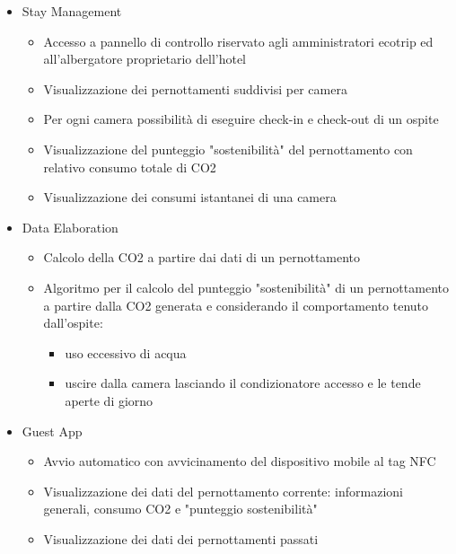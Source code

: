 \begin{itemize}
    \begin{itemize}
        \item Stay Management
        \begin{itemize}
            \item Accesso a pannello di controllo riservato agli amministratori ecotrip ed all'albergatore proprietario dell'hotel
            \item Visualizzazione dei pernottamenti suddivisi per camera
            \item Per ogni camera possibilità di eseguire check-in e check-out di un ospite
            \item Visualizzazione del punteggio "sostenibilità" del pernottamento con relativo consumo totale di CO2
            \item Visualizzazione dei consumi istantanei di una camera
        \end{itemize}
    \end{itemize}

    \begin{itemize}
        \item Data Elaboration
        \begin{itemize}
            \item Calcolo della CO2 a partire dai dati di un pernottamento
            \item Algoritmo per il calcolo del punteggio "sostenibilità" di un pernottamento a partire dalla CO2 generata e considerando il comportamento tenuto dall'ospite:
            \begin{itemize}
                \item uso eccessivo di acqua
                \item uscire dalla camera lasciando il condizionatore accesso e le tende aperte di giorno  
            \end{itemize}
        \end{itemize}
    \end{itemize}

    \begin{itemize}
        \item Guest App
        \begin{itemize}
            \item Avvio automatico con avvicinamento del dispositivo mobile al tag NFC
            \item Visualizzazione dei dati del pernottamento corrente: informazioni generali, consumo CO2 e "punteggio sostenibilità"
            \item Visualizzazione dei dati dei pernottamenti passati
        \end{itemize}
    \end{itemize}
    

\end{itemize}
